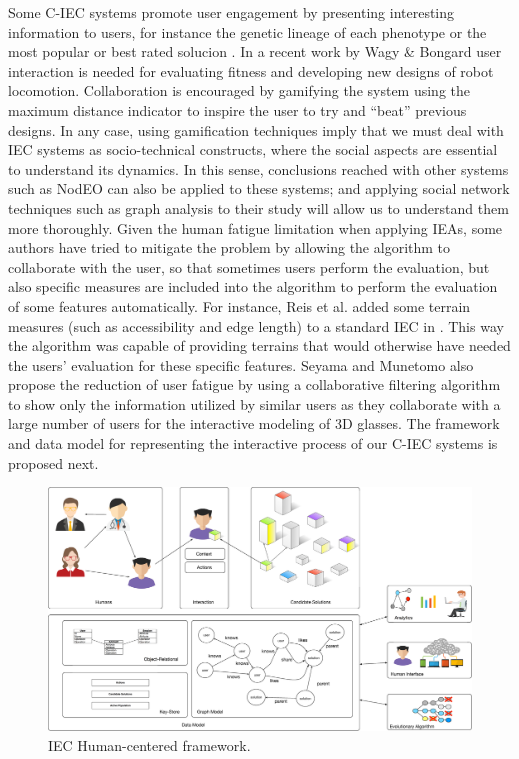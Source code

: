 Some C-IEC systems promote user engagement by presenting interesting information to 
users, for instance the genetic lineage of each phenotype or the most popular or 
best rated solucion \cite{picbreeder,forms}. In a recent work by 
Wagy \& Bongard \cite{wagy2014collective} user interaction 
is needed for evaluating fitness and developing
new designs of robot locomotion. Collaboration is encouraged by gamifying the system 
using the maximum distance indicator to inspire the user to try and ``beat'' previous designs. 
In any case, using gamification techniques imply that we must deal with IEC
systems as socio-technical constructs, where the social aspects are
essential to understand its dynamics. In this sense, conclusions
reached with other systems such as NodEO \cite{DBLP:conf/gecco/MereloCGCRV16}
can also be applied to these systems; and applying social 
network techniques such as graph analysis
to their study will allow us to understand them more thoroughly. 
Given the human fatigue limitation when applying IEAs, some authors 
have tried to mitigate the problem by allowing the algorithm to 
collaborate with the user, so that sometimes 
users perform the evaluation,  but also specific measures are included 
into the algorithm to perform the
evaluation of some features automatically. For instance, 
Reis et al. added some terrain measures (such as accessibility and edge length) 
to a standard  IEC in \cite{DBLP:journals/soco/FradeVC12}. 
This way the algorithm was capable of providing terrains that would otherwise have needed the
users' evaluation for these specific features. Seyama and Munetomo \cite{seyama2016development}
also propose the reduction of user fatigue by using 
a collaborative filtering algorithm to show only the information utilized by similar users as 
they collaborate with a large number of users for the interactive modeling of 3D glasses. 
The framework and data model for 
representing the interactive process of our C-IEC systems is proposed next.

\begin{figure}[!t]
    \centering
        \includegraphics[width=6in]{img/framework.eps}
    \caption{IEC Human-centered framework.}
    \label{fig:hc_framework}
\end{figure}

